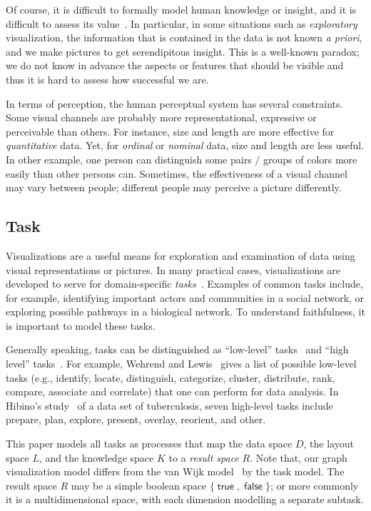 \documentclass[10pt,journal,cspaper,compsoc]{IEEEtran}
\def\true{\mathop{\textsf{true}}\nolimits}
\def\false{\mathop\textsf{false}}
\begin{document}
Of course, it is difficult to formally model human knowledge or insight, and
it is difficult to assess its value~\cite{north2006toward}. In particular, in some
situations such as \emph{exploratory} visualization, the information
that is contained in the data is not known \emph{a priori}, and we make
pictures to get serendipitous insight.
This is a well-known paradox; we do not know in advance the aspects or features that should be visible and thus it is hard to assess how successful we are.

In terms of perception, the human perceptual system has several constraints. Some visual channels are probably more representational, expressive or perceivable than others. For instance, size and length are more effective for \emph{quantitative} data. Yet, for \emph{ordinal} or \emph{nominal} data, size and length are less useful.
In other example, one person can distinguish some pairs / groups of colors more easily than other persons can. Sometimes, the effectiveness of a visual channel may vary between people; different people may perceive a picture differently.

\subsection{Task}
Visualizations are a useful means for exploration and examination of data using visual representations or pictures. In many practical cases, visualizations are developed to serve for domain-specific \emph{tasks}~\cite{treinish1998task}. 
Examples of common tasks include, for example, identifying important actors and communities in a social network, or exploring possible pathways in a biological network. To understand faithfulness, it is important to model these tasks. 

Generally speaking, tasks can be distinguished as ``low-level'' tasks~\cite{Wehrend1990} and  ``high level'' tasks~\cite{hibino1999task}. 
For example, Wehrend and Lewis~\cite{Wehrend1990} gives a list of possible low-level tasks (e.g., identify, locate, distinguish, categorize, cluster, distribute, rank, compare, associate and correlate) that one can perform for data analysis. In Hibino's study~\cite{hibino1999task} of a data set of tuberculosis, seven high-level tasks include prepare, plan, explore, present, overlay, reorient, and other.


This paper models all tasks as processes that map the data space $D$,
the layout space $L$, and the knowledge space $K$ to a
\emph{result space} $R$. 
Note that, our graph visualization model differs from the van Wijk model~\cite{van2005value} by the task model. The result space $R$ may be a simple boolean
space $\{ \true , \false \}$; or more commonly it is a multidimensional
space, with each dimension modelling a separate
subtask.
\end{document}
